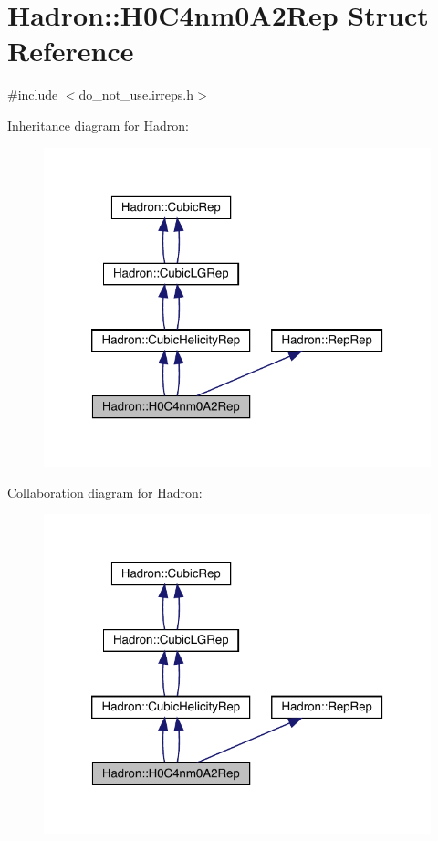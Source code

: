 \hypertarget{structHadron_1_1H0C4nm0A2Rep}{}\section{Hadron\+:\+:H0\+C4nm0\+A2\+Rep Struct Reference}
\label{structHadron_1_1H0C4nm0A2Rep}


{\ttfamily \#include $<$do\+\_\+not\+\_\+use.\+irreps.\+h$>$}



Inheritance diagram for Hadron\+:\nopagebreak
\begin{figure}[H]
\begin{center}
\leavevmode
\includegraphics[width=320pt]{df/dab/structHadron_1_1H0C4nm0A2Rep__inherit__graph}
\end{center}
\end{figure}


Collaboration diagram for Hadron\+:\nopagebreak
\begin{figure}[H]
\begin{center}
\leavevmode
\includegraphics[width=320pt]{d6/d77/structHadron_1_1H0C4nm0A2Rep__coll__graph}
\end{center}
\end{figure}
